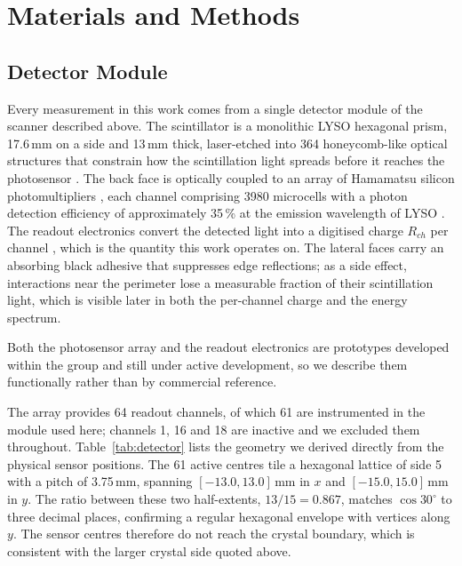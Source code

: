 \documentclass[10pt,conference]{IEEEtran}
\begin{document}
\section{Materials and Methods}

\subsection{Detector Module}
\label{sec:detector}

Every measurement in this work comes from a single detector module of the
scanner described above. The scintillator is a monolithic LYSO hexagonal
prism, 17.6\,mm on a side and 13\,mm thick, laser-etched into 364
honeycomb-like optical structures that constrain how the scintillation light
spreads before it reaches the photosensor
\cite{perez-benito_laser-microstructured_2025}. The back face is optically
coupled to an array of Hamamatsu silicon photomultipliers
\cite{perez-benito_sipm-based_2019}, each channel comprising 3980 microcells
with a photon detection efficiency of approximately 35\,\% at the emission
wavelength of LYSO \cite{jimenez2025}. The readout electronics convert the
detected light into a digitised charge $R_{ch}$ per channel
\cite{gundacker2020}, which is the quantity this work operates on. The lateral
faces carry an absorbing black adhesive that suppresses edge reflections; as a
side effect, interactions near the perimeter lose a measurable fraction of
their scintillation light, which is visible later in both the per-channel
charge and the energy spectrum.

Both the photosensor array and the readout electronics are prototypes developed
within the group and still under active development, so we describe them
functionally rather than by commercial reference.

The array provides 64 readout channels, of which 61 are instrumented in the
module used here; channels 1, 16 and 18 are inactive and we excluded them
throughout. Table~\ref{tab:detector} lists the geometry we derived directly
from the physical sensor positions. The 61 active centres tile a hexagonal
lattice of side 5 with a pitch of 3.75\,mm, spanning
$[-13.0, 13.0]$\,mm in $x$ and $[-15.0, 15.0]$\,mm in $y$. The ratio between
these two half-extents, $13/15 = 0.867$, matches $\cos 30^{\circ}$ to three
decimal places, confirming a regular hexagonal envelope with vertices along
$y$. The sensor centres therefore do not reach the crystal boundary, which is
consistent with the larger crystal side quoted above.
\end{document}
